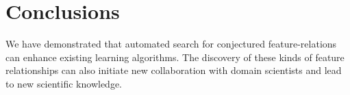 \documentclass[ijds,nonblindrev]{informs-ijds}
\begin{document}




\section{Conclusions}
\label{conclusions}
We have demonstrated that automated search for conjectured feature-relations can enhance existing learning algorithms.  The discovery of these kinds of feature relationships can also initiate new collaboration with domain scientists and lead to new scientific knowledge.
\end{document}
